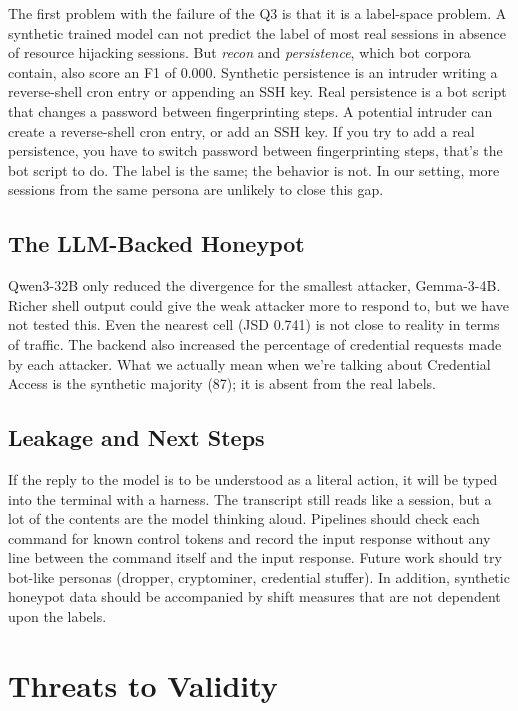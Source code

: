 \documentclass[runningheads]{llncs}
\begin{document}
The first problem with the failure of the Q3 is that it is a label-space problem. A synthetic trained model can not predict the label of most real sessions in absence of resource hijacking sessions. But \emph{recon} and \emph{persistence}, which bot corpora contain, also score an F1 of 0.000. Synthetic persistence is an intruder writing a reverse-shell cron entry or appending an SSH key. Real persistence is a bot script that changes a password between fingerprinting steps. A potential intruder can create a reverse-shell cron entry, or add an SSH key. If you try to add a real persistence, you have to switch password between fingerprinting steps, that's the bot script to do. The label is the same; the behavior is not. In our setting, more sessions from the same persona are unlikely to close this gap.

\subsection{The LLM-Backed Honeypot}

Qwen3-32B only reduced the divergence for the smallest attacker, Gemma-3-4B. Richer shell output could give the weak attacker more to respond to, but we have not tested this. Even the nearest cell (JSD 0.741) is not close to reality in terms of traffic. The backend also increased the percentage of credential requests made by each attacker. What we actually mean when we're talking about Credential Access is the synthetic majority (87); it is absent from the real labels.

\subsection{Leakage and Next Steps}

If the reply to the model is to be understood as a literal action, it will be typed into the terminal with a harness. The transcript still reads like a session, but a lot of the contents are the model thinking aloud. Pipelines should check each command for known control tokens and record the input response without any line between the command itself and the input response. Future work should try bot-like personas (dropper, cryptominer, credential stuffer). In addition, synthetic honeypot data should be accompanied by shift measures that are not dependent upon the labels.

\section{Threats to Validity}\label{sec:threats}
\end{document}
